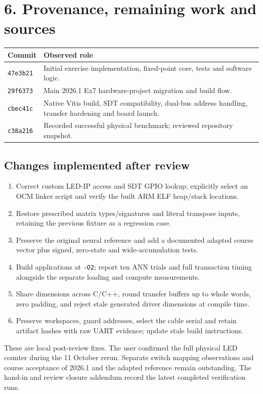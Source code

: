 \documentclass[11pt,a4paper]{article}
\begin{document}
\section*{6. Provenance, remaining work and sources}
\small
\begin{tabularx}{\linewidth}{P{2.3cm} Y}
\toprule Commit & Observed role \\
\midrule
\texttt{47e3b21} & Initial exercise implementation, fixed-point core, tests and software logic. \\
\texttt{29f6373} & Main 2026.1 Ex7 hardware-project migration and build flow. \\
\texttt{cbec41c} & Native Vitis build, SDT compatibility, dual-bus address handling, transfer hardening and board launch. \\
\texttt{c38a216} & Recorded successful physical benchmark; reviewed repository snapshot. \\
\bottomrule
\end{tabularx}
\normalsize

\subsection*{Changes implemented after review}
\begin{enumerate}
\item Correct custom LED-IP access and SDT GPIO lookup; explicitly select an
OCM linker script and verify the built ARM ELF heap/stack locations.
\item Restore prescribed matrix types/signatures and literal transpose inputs,
retaining the previous fixture as a regression case.
\item Preserve the original neural reference and add a documented adapted
course vector plus signed, zero-state and wide-accumulation tests.
\item Build applications at \texttt{-O2}; report ten ANN trials and full
transaction timing alongside the separate loading and compute measurements.
\item Share dimensions across C/C++, round transfer buffers up to whole words,
zero padding, and reject stale generated driver dimensions at compile time.
\item Preserve workspaces, guard addresses, select the cable serial and retain
artifact hashes with raw UART evidence; update stale build instructions.
\end{enumerate}
These are local post-review fixes. The user confirmed the full physical LED
counter during the 11 October rerun. Separate switch mapping observations and course
acceptance of 2026.1 and the adapted reference remain outstanding. The hand-in
and review closure addendum record the latest completed verification runs.
\end{document}
